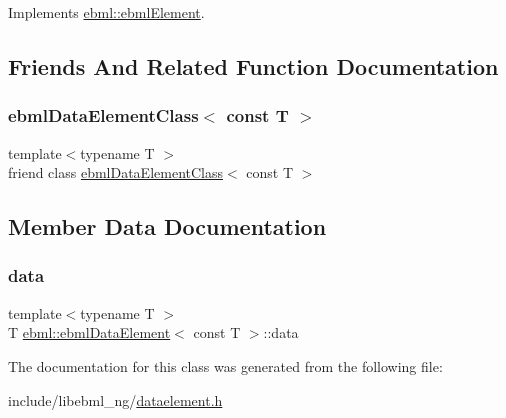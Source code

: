 Implements \mbox{\hyperlink{classebml_1_1ebmlElement_a7852173aeef78bd843939ae5a82f1d1c}{ebml\+::ebml\+Element}}.



\subsection{Friends And Related Function Documentation}
\mbox{\label{classebml_1_1ebmlDataElement_3_01const_01T_01_4_aea1d7162edf00e39cf37b106860abbcd}} 
\subsubsection{\texorpdfstring{ebml\+Data\+Element\+Class$<$ const T $>$}{ebmlDataElementClass< const T >}}
{\footnotesize\ttfamily template$<$typename T $>$ \\
friend class \mbox{\hyperlink{classebml_1_1ebmlDataElementClass}{ebml\+Data\+Element\+Class}}$<$ const T $>$\hspace{0.3cm}{\ttfamily [friend]}}



\subsection{Member Data Documentation}
\mbox{\label{classebml_1_1ebmlDataElement_3_01const_01T_01_4_ac3870bb3b5d9d0e3063a80768fe83904}} 
\subsubsection{\texorpdfstring{data}{data}}
{\footnotesize\ttfamily template$<$typename T $>$ \\
T \mbox{\hyperlink{classebml_1_1ebmlDataElement}{ebml\+::ebml\+Data\+Element}}$<$ const T $>$\+::data}



The documentation for this class was generated from the following file\+:\begin{DoxyCompactItemize}
\item 
include/libebml\+\_\+ng/\mbox{\hyperlink{dataelement_8h}{dataelement.\+h}}\end{DoxyCompactItemize}
